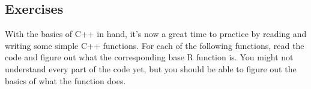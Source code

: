 \hypertarget{exercises}{%
\subsection{Exercises}\label{exercises}}

With the basics of C++ in hand, it's now a great time to practice by
reading and writing some simple C++ functions. For each of the following
functions, read the code and figure out what the corresponding base R
function is. You might not understand every part of the code yet, but
you should be able to figure out the basics of what the function does.

\begin{Shaded}
\begin{Highlighting}[]
  \NormalTok{;}

  \NormalTok{(}
\NormalTok{  \}}
\NormalTok{\}}


\NormalTok{  out[}\NormalTok{] = x[}\NormalTok{];}
  \NormalTok{(}
\NormalTok{    out[i] = out[i - }\NormalTok{] + x[i];}
\NormalTok{  \}}
\NormalTok{\}}


  \NormalTok{(}
     \NormalTok{;}
\NormalTok{  \}}
   \NormalTok{;}
\NormalTok{\}}


  \NormalTok{(}
    \NormalTok{ (res[}\NormalTok{]) }\NormalTok{;}
\NormalTok{  \}}
   \NormalTok{;}
\NormalTok{\}}


\end{Highlighting}
\end{Shaded}
